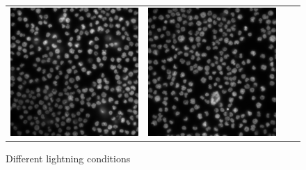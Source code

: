 \begin{figure}
\begin{tabularx}{\textwidth}{YYYY}
            \includegraphics{bilder/lightning-conditions/lightning-3.png} & 
            \includegraphics{bilder/lightning-conditions/lightning-4.png}
        \end{tabularx}
    \caption{Different lightning conditions}
    \label{fig:lightning_conditions}
\end{figure}